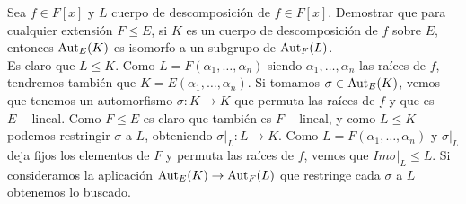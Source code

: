 \begin{ejercicio}
    Sea $f\in F[x]$ y $L$ cuerpo de descomposición de $f\in F[x]$. Demostrar que para cualquier extensión $F\leq E$, si $K$ es un cuerpo de descomposición de $f$ sobre $E$, entonces $\operatorname{Aut}_E(K)$ es isomorfo a un subgrupo de $\operatorname{Aut}_F(L)$.\\

    \noindent
    Es claro que $L\leq K$. Como $L = F(\alpha_1,\ldots,\alpha_n)$ siendo $\alpha_1,\ldots,\alpha_n$ las raíces de $f$, tendremos también que $K = E(\alpha_1,\ldots,\alpha_n)$. Si tomamos $\sigma \in \operatorname{Aut}_E(K)$, vemos que tenemos un automorfismo $\sigma:K\to K$ que permuta las raíces de $f$ y que es $E-$lineal. Como $F\leq E$ es claro que también es $F-$lineal, y como $L\leq K$ podemos restringir $\sigma$ a $L$, obteniendo $\sigma\big|_L:L\to K$. Como $L = F(\alpha_1,\ldots,\alpha_n)$ y $\sigma\big|_L$ deja fijos los elementos de $F$ y permuta las raíces de $f$, vemos que $Im \sigma\big|_L\leq L$. Si consideramos la aplicación $\operatorname{Aut}_E(K)\to \operatorname{Aut}_F(L)$ que restringe cada $\sigma$ a $L$ obtenemos lo buscado.
\end{ejercicio}

